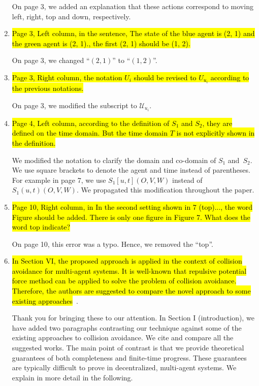 \documentclass{article}[12pt]
\begin{document}
\begin{enumerate}
On page 3, we added an explanation that these actions correspond to moving left, right, top and down, respectively.

\item \hl{Page 3, Left column, in the sentence, The state of the blue agent is (2, 1) and the green agent is (2, 1)., the first (2, 1) should be (1, 2).}
	
On page 3, we changed “$(2,1)$” to “$(1,2)$”.

\item \hl{Page 3, Right column, the notation $U_i$ should be revised to $U_{u_i}$ according to the previous notations.}

 On page 3, we modified the subscript to $\mathcal{U}_{u_i}$. 

\item \hl{Page 4, Left column, according to the definition of $S_1$ and $S_2$, they are defined on the time domain. But the time domain $T$ is not explicitly shown in the definition.}
	
We modified the notation to clarify the domain and co-domain of $S_1$ and~$S_2$. We use square brackets to denote the agent and time instead of parentheses. 
For example in page 7, we use $S_1[u,t](O,V,W)$ instead of $S_1(u,t)(O,V,W)$.
We propagated this modification throughout the paper. 

\item \hl{Page 10, Right column, in In the second setting shown in 7 (top)..., the word Figure should be added. There is only one figure in Figure 7. What does the word top indicate?}
	
On page 10, this error was a typo. Hence, we removed the “top”.

\item \hl{In Section VI, the proposed approach is applied in the context of collision avoidance for multi-agent systems. It is well-known that repulsive potential force method can be applied to solve the problem of collision avoidance. Therefore, the authors are suggested to compare the novel approach to some existing approaches}~\cite{Zhu2020AdaptiveOD,Zhu2019,Rudd2017,AlAbri2020ADO}.

Thank you for bringing these to our attention. In Section I (introduction), we have added two paragraphs contrasting our technique against some of the existing approaches to collision avoidance. We cite and compare all the suggested works. The main point of contrast is that we provide theoretical guarantees of both completeness and finite-time progress. These guarantees are typically difficult to prove in decentralized, multi-agent systems. We explain in more detail in the following.  


\end{enumerate}
\end{document}
